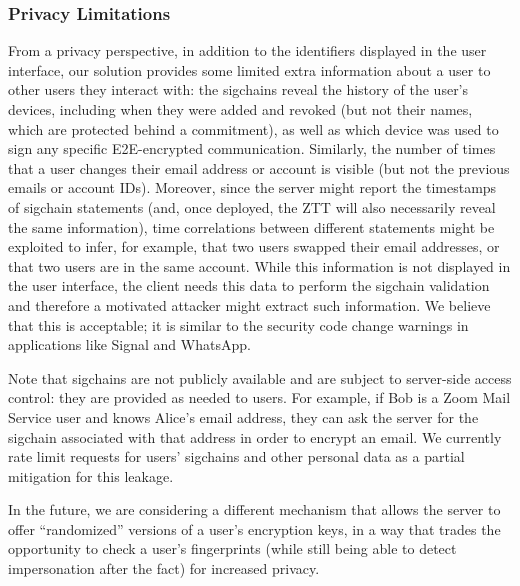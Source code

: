 \subsubsection{Privacy Limitations}

From a privacy perspective, in addition to the identifiers displayed in the user interface, our
solution provides some limited extra information about a user to other users they interact with: the
sigchains reveal the history of the user's devices, including when they were added and revoked (but
not their names, which are protected behind a commitment), as well as which device was used to sign
any specific E2E-encrypted communication. Similarly, the number of times that a user changes their
email address or account is visible (but not the previous emails or account IDs). Moreover, since
the server might report the timestamps of sigchain statements (and, once deployed, the ZTT will also
necessarily reveal the same information), time correlations between different statements might be
exploited to infer, for example, that two users swapped their email addresses, or that two users are
in the same account. While this information is not displayed in the user interface, the client needs
this data to perform the sigchain validation and therefore a motivated attacker might extract such
information. We believe that this is acceptable; it is similar to the security code change warnings
in applications like Signal and WhatsApp.

Note that sigchains are not publicly available and are subject to server-side access control: they
are provided as needed to users. For example, if Bob is a Zoom Mail Service user and knows Alice's
email address, they can ask the server for the sigchain associated with that address in order to
encrypt an email. We currently rate limit requests for users' sigchains and other personal data as a
partial mitigation for this leakage.

In the future, we are considering a different mechanism that allows the server to offer
``randomized'' versions of a user's encryption keys, in a way that trades the opportunity to check a
user's fingerprints (while still being able to detect impersonation after the fact) for increased
privacy.
